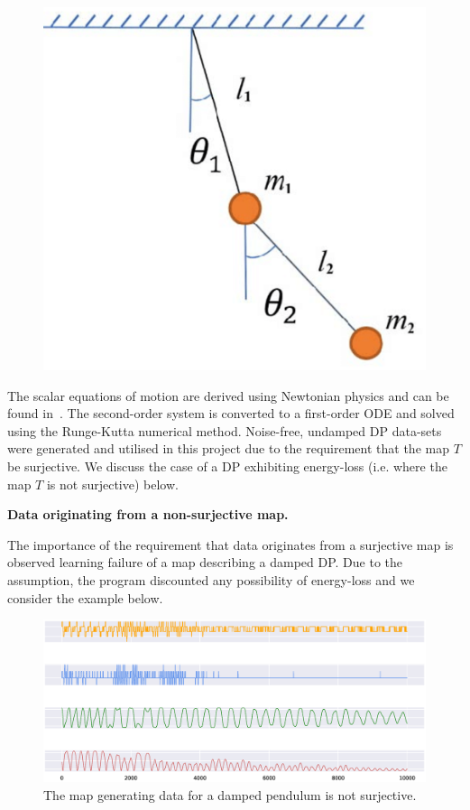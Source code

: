 \documentclass[a4paper,12pt,twoside]{report}
\begin{document}
\begin{figure}[ht]
  \includegraphics[scale=0.35]{_dp_setup.eps}
  \centering
  \label{fig:dp_setup}
\end{figure}

The scalar equations of motion are derived using Newtonian physics and can be found in~\cite{DPFormulas}. The second-order system is converted to a first-order ODE and solved using the Runge-Kutta numerical method.  Noise-free, undamped DP data-sets were generated and utilised in this project due to the requirement that the map $T$ be surjective. We discuss the case of a DP exhibiting energy-loss (i.e. where the map $T$ is not surjective) below.

\textbf{Data originating from a non-surjective map.}

The importance of the requirement that data originates from a surjective map is observed learning failure of a map describing a damped DP.
Due to the assumption, the program discounted any possibility of energy-loss and we consider the example below. 

\begin{figure}[ht]
  \includegraphics[scale=0.4]{_dp_dying.eps}
  \centering
\caption{The map generating data for a damped pendulum is not surjective.}
\label{fig:damped_pendulum}
\end{figure}
\end{document}
